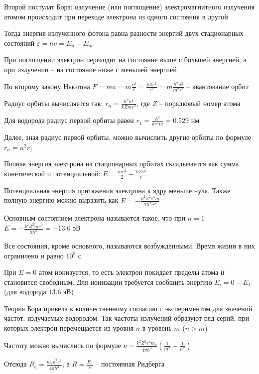 \documentclass[12pt]{article}
\begin{document}
Второй постулат Бора: излучение (или поглощение) электромагнитного излучения атомом происходит при переходе электрона из одного состояния в другой

Тогда энергия излученного фотона равна разности энергий двух стационарных состояний $\varepsilon = h \nu = E_n - E_m$

При поглощении электрон переходит на состояние выше с большей энергией, а при излучении -- на состояние ниже с меньшей энергией

По второму закону Ньютона $F = m a = m \frac{v^2}{r} = \frac{k Z e^2}{r^2} = m \frac{\hbar^2 n^2}{m^2 r^3}$ -- квантование орбит 

Радиус орбиты вычисляется так: $r_n = \frac{\hbar^2 n^2}{k Z m e^2}$, где $Z$ -- порядковый номер атома

Для водорода радиус первой орбиты равен $r_1 = \frac{\hbar^2}{k e^2 m} = 0.529$ нм

Далее, зная радиус первой орбиты, можно вычислить другие орбиты по формуле $r_n = n^2 r_1$


\smallvspace

Полная энергия электрона на стационарных орбитах складывается как сумма кинетической и потенциальной: $E = \frac{m v^2}{2} - \frac{k Z e^2}{r}$

Потенциальная энергия притяжения электрона к ядру меньше нуля. Также полную энергию можно выразить как $E = -\frac{k^2 Z^2 e^4 m}{2 \hbar^2 n^2}$

Основным состоянием электрона называется такое, что при $n = 1$ $E = -\frac{k^2 Z^2 m e^4}{2\hbar^2} = -13.6$ эВ 

Все состояния, кроме основного, называются возбужденными. Время жизни в них ограничено и равно $10^8$ с

При $E = 0$ атом ионизуется, то есть электрон покидает пределы атома и становится свободным. Для ионизации требуется сообщить энергию $E_i = 0 - E_1$ (для водорода $13.6$ эВ)

\mediumvspace

Теория Бора привела к количественному согласию с экспериментом для значений частот, излучаемых водородом. Так частоты излучений образуют ряд серий, при которых электрон перемещается из уровня $n$ в уровень $m$ ($n > m$)

Частоту можно вычислить по формуле $\nu = \frac{k^2 Z^2 e^4 m_e}{4 \pi \hbar^3} \left(\frac{1}{m^2} - \frac{1}{n^2}\right)$

Отсюда $R_c = \frac{m_e k^2 e^4}{4 \pi \hbar^3}$, а $R = \frac{R_c}{c}$ -- постоянная Ридберга
\end{document}
